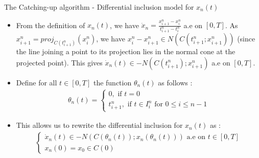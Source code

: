 \documentclass[8pt,aspectratio=169]{beamer}
\begin{document}
\begin{frame}{The Catching-up algorithm - Differential inclusion model for $x_n(t)$}
    \begin{itemize}
        \item From the definition of $x_n(t)$, we have $\dot{x}_n = \frac{x_{i+1}^n - x_i^n}{t_{i+1}^n - t_i^n}$ a.e on $[0, T]$. As $x_{i+1}^n = proj_{C(t_{i+1}^n)}(x_i^n)$, we have $x_i^n - x_{i+1}^n \in N(C(t_{i+1}^n; x_{i+1}^n))$ (since the line joining a point to its projection lies in the normal cone at the projected point). This gives $\dot{x}_n(t) \in -N(C(t_{i+1}^n); x_{i+1}^n)$ a.e on $[0, T]$.
        \item Define for all $t \in [0, T]$ the function $\theta_n(t)$ as follows : 
            \begin{align*}
                \theta_n(t) = \begin{cases}
                0, \text{ if } t = 0\\
                t_{i+1}^n, \text{ if } t \in I_i^n \text{ for } 0 \leq i \leq n-1
                \end{cases}
            \end{align*}
        \item This allows us to rewrite the differential inclusion for $x_n(t)$ as :
        \begin{align}\label{DI}
            \begin{cases}
            \dot{x}_n(t) \in -N(C(\theta_n(t)); x_n(\theta_n(t))) \text{ a.e on } t \in [0, T]\\
            x_n(0) = x_0 \in C(0)
            \end{cases}
        \end{align}
    \end{itemize}
\end{frame}
\end{document}
